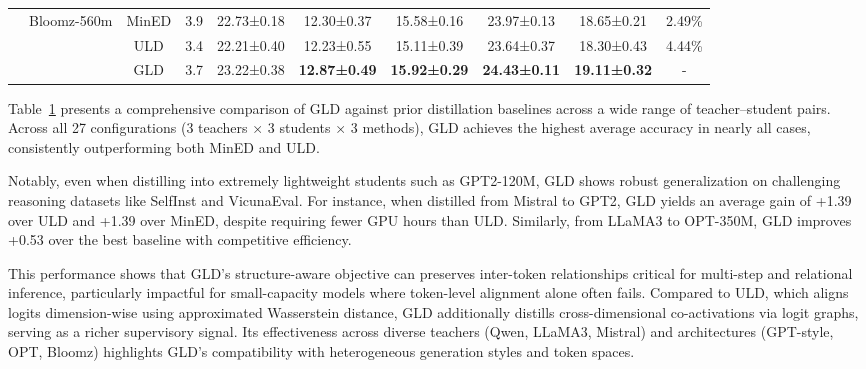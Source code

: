 \documentclass{article}
\begin{document}
\begin{table}[t]
{\begin{tabular}{l|l|ccccccc|c}
                                             & \multirow{3}{*}{Bloomz-560m}    & MinED                & 3.9     & 22.73±0.18          & 12.30±0.37          & 15.58±0.16          & 23.97±0.13          & 18.65±0.21          & 2.49\%  \\
                                             &                                 & ULD                  & 3.4     & 22.21±0.40          & 12.23±0.55          & 15.11±0.39          & 23.64±0.37          & 18.30±0.43          & 4.44\%  \\
                                             &                                 & GLD                  & 3.7     & 23.22±0.38          & \textbf{12.87±0.49} & \textbf{15.92±0.29} & \textbf{24.43±0.11} & \textbf{19.11±0.32} & -  \\
\bottomrule
\end{tabular}}
\label{tab:distillation-results}
\end{table}

Table~\ref{tab:distillation-results} presents a comprehensive comparison of GLD against prior distillation baselines across a wide range of teacher–student pairs. Across all 27 configurations (3 teachers × 3 students × 3 methods), GLD achieves the highest average accuracy in nearly all cases, consistently outperforming both MinED and ULD.

Notably, even when distilling into extremely lightweight students such as GPT2-120M, GLD shows robust generalization on challenging reasoning datasets like SelfInst and VicunaEval. For instance, when distilled from Mistral to GPT2, GLD yields an average gain of +1.39 over ULD and +1.39 over MinED, despite requiring fewer GPU hours than ULD. Similarly, from LLaMA3 to OPT-350M, GLD improves +0.53 over the best baseline with competitive efficiency.

This performance shows that GLD’s structure-aware objective can preserves inter-token relationships critical for multi-step and relational inference, particularly impactful for small-capacity models where token-level alignment alone often fails. Compared to ULD, which aligns logits dimension-wise using approximated Wasserstein distance, GLD additionally distills cross-dimensional co-activations via logit graphs, serving as a richer supervisory signal. Its effectiveness across diverse teachers (Qwen, LLaMA3, Mistral) and architectures (GPT-style, OPT, Bloomz) highlights GLD’s compatibility with heterogeneous generation styles and token spaces.

\end{document}

